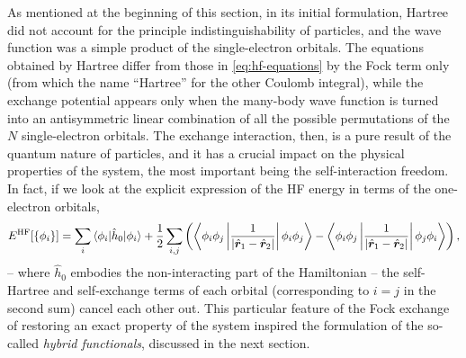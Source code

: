 As mentioned at the beginning of this section, in its initial formulation, Hartree did not account for the principle indistinguishability of particles, and the wave function was a simple product of the single-electron orbitals. The equations obtained by Hartree differ from those in \eqref{eq:hf-equations} by the Fock term only (from which the name ``Hartree'' for the other Coulomb integral), while the exchange potential appears only when the many-body wave function is turned into an antisymmetric linear combination of all the possible permutations of the $N$ single-electron orbitals. The exchange interaction, then, is a pure result of the quantum nature of particles, and it has a crucial impact on the physical properties of the system, the most important being the self-interaction freedom. In fact, if we look at the explicit expression of the HF energy in terms of the one-electron orbitals,
%
\begin{equation}
    E^{\rm HF}[\{ \phi_i \}] = \sum_i \braket{\phi_i|\hat{h}_0|\phi_i} + \frac{1}{2} \sum_{i,j} \left( \left\langle \phi_i\phi_j \left| \frac{1}{|\hat{{\bm r}}_1-\hat{{\bm r}}_2|} \right| \phi_i\phi_j \right\rangle
    - \left\langle \phi_i\phi_j \left| \frac{1}{|\hat{{\bm r}}_1-\hat{{\bm r}}_2|} \right| \phi_j\phi_i \right\rangle
    \right) ,
    \label{eq:hf-energy}
\end{equation}
%
-- where $\hat{h}_0$ embodies the non-interacting part of the Hamiltonian -- the self-Hartree and self-exchange terms of each orbital (corresponding to $i=j$ in the second sum) cancel each other out. This particular feature of the Fock exchange of restoring an exact property of the system inspired the formulation of the so-called \emph{hybrid functionals}, discussed in the next section.

